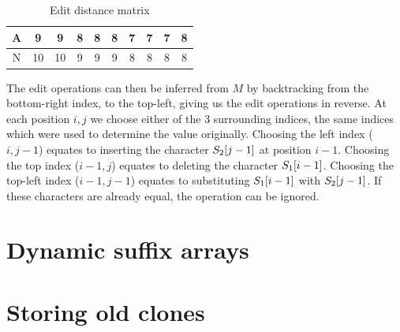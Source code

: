 \begin{table}
\begin{center}
\begin{tabular}[c]{c|c|c|c|c|c|c|c|c|c|}
			A & 9                    & 9                    & 8                    & 8                    & 8                    & 7                    & 7                    & \cellcolor{blue!25}7 & 8                    \\\hline
			N & 10                   & 10                   & 9                    & 9                    & 9                    & 8                    & 8                    & 8                    & \cellcolor{blue!25}8 \\\hline

			\hline
		\end{tabular}
	\end{center}
	\caption{Edit distance matrix}
	\label{table:wagnerfischermatrix}
\end{table}


The edit operations can then be inferred from $M$ by backtracking from the bottom-right
index, to the top-left, giving us the edit operations in reverse. At each position $i, j$
we choose either of the 3 surrounding indices, the same indices which were used to
determine the value originally. Choosing the left index ($i, j - 1$) equates to inserting
the character $S_2[{j - 1}]$ at position $i - 1$. Choosing the top index ($i -
1, j$) equates to deleting the character $S_1[{i - 1}]$. Choosing the top-left
index ($i - 1, j - 1$) equates to substituting $S_1[{i - 1}]$ with
$S_2[{j - 1}]$. If these characters are already equal, the operation can be
ignored.




\section{Dynamic suffix arrays}

\section{Storing old clones}
